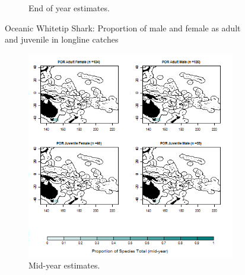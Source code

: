 \documentclass[12pt]{SCreport}
\begin{document}
\begin{landscape}
\begin{figure}
\begin{subfigure}[b]{0.6\textwidth}
       \caption{End of year estimates.}
       \label{fig:test2}
   \end{subfigure}
\caption{Oceanic Whitetip Shark: Proportion of male and female as adult and juvenile in longline catches }
\label{fig:test} 
\end{figure}
\end{landscape}

\begin{landscape}
\begin{figure}
\centering
   \begin{subfigure}[b]{0.6\textwidth}
       \includegraphics[width=\textwidth]{../GRAPHICS/Defined/BI_30_Map_maturity_sex_POR_MY}
       \caption{Mid-year estimates.}
       \label{fig:test1}
   \end{subfigure}
   \begin{subfigure}[b]{0.6\textwidth}

\end{subfigure}
\end{figure}
\end{landscape}
\end{document}
